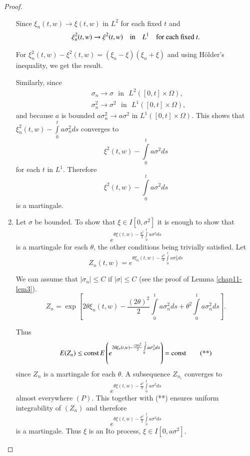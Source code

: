 \begin{proof}
\begin{enumerate}
Since $\xi_{n}(t,w)\to \xi(t,w)$ in $L^{2}$ for each fixed $t$ and
$$
\xi^{2}_{n}(t,w)\to \xi^{2}(t,w)\quad\text{in}\quad L^{1}\quad\text{for
  each fixed~} t.
$$

For $\xi^{2}_{n}(t,w)-\xi^{2}(t,w)=(\xi_{n}-\xi)(\xi_{n}+\xi)$ and
using H\"older's inequality, we get the result.

Similarly, since
\begin{align*}
& \sigma_{n}\to \sigma\text{~ in~ } L^{2}([0,t]\times\Omega),\\
& \sigma^{2}_{n}\to \sigma^{2}\text{~ in~ }L^{1}([0,t]\times\Omega),
\end{align*}
and because $a$ is bounded $a\sigma^{2}_{n}\to a\sigma^{2}$ in
$L^{1}([0,t]\times\Omega)$. This shows that
$\xi^{2}_{n}(t,w)-\int\limits^{t}_{0}a\sigma^{2}_{n}ds$ converges to
$$
\xi^{2}(t,w)-\int\limits^{t}_{0}a\sigma^{2}ds
$$
for each $t$ in $L^{1}$. Therefore
$$
\xi^{2}(t,w)-\int\limits^{t}_{0}a\sigma^{2}ds
$$\pageoriginale
is a martingale.

\item Let $\sigma$ be bounded. To show that $\xi\in I[0,\sigma^{2}]$
  it is enough to show that
$$
e^{\theta\xi(t,w)-\frac{\theta^{2}}{2}\int\limits^{t}_{0}a\sigma^{2}ds}
$$
is a martingale for each $\theta$, the other conditions being
trivially satisfied. Let
$$
Z_{n}(t,w)=e^{\theta\xi_{n}(t,w)-\frac{\theta^{2}}{2}\int\limits^{t}_{0}a\sigma^{2}_{n}ds}
$$

We can assume that $|\sigma_{n}|\leq C$ if $|\sigma|\leq C$ (see the
proof of Lemma \ref{chap11-lem3}).
$$
Z_{n}=\exp\left[2\theta\xi_{n}(t,w)-\frac{(2\theta)^{2}}{2}\int\limits^{t}_{0}a\sigma^{2}_{n}ds+\theta^{2}\int\limits^{t}_{0}a\sigma^{2}_{n}ds\right].
$$

Thus
\begin{equation*}
E(Z_{n})\leq \text{const\,}E\left(e^{2\theta \xi_{n}(t,w)-\frac{(2\theta)^{2}}{2}\int\limits^{t}_{0}a\sigma^{2}_{n}ds}\right)=\text{const}\tag{**}
\end{equation*}
since $Z_{n}$ is a martingale for each $\theta$. A subsequence
$Z_{n_{i}}$ converges to
$$
e^{\theta\xi(t,w)-\frac{\theta^{2}}{2}\int\limits^{t}_{0}a\sigma^{2}ds}
$$
almost everywhere $(P)$. This together with (**) ensures uniform
integrability of $(Z_{n})$ and therefore
$$
e^{\theta\xi(t,w)-\frac{\theta^{2}}{2}\int\limits^{t}_{0}a\sigma^{2}ds}
$$
is a martingale. Thus $\xi$ is an Ito process, $\xi\in I[0,a\sigma^{2}]$.
\end{enumerate}
\end{proof}

